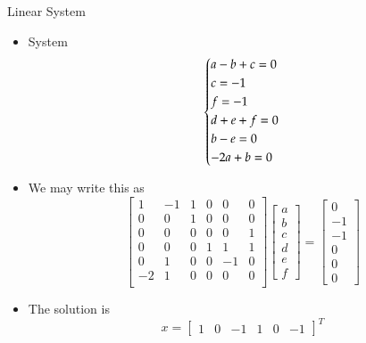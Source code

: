 \documentclass[10pt]{beamer}
\begin{document}
\begin{frame}{Linear System}

\begin{itemize}
    \item System 
    $$
    \begin{dcases}
        a - b + c=0\\
        c = -1\\
        f = -1\\
        d + e + f = 0\\
        b -e= 0\\
        -2a+b = 0
    \end{dcases}
    $$
    \item We may write this as
    $$
    \begin{bmatrix}
        1 & -1 & 1 & 0 & 0 &0\\
        0 & 0 & 1 & 0 & 0 & 0\\
        0 & 0 & 0 & 0 & 0 & 1\\
        0 & 0 & 0 & 1 & 1 & 1\\
        0 & 1 & 0 & 0 & -1 & 0\\
        -2 & 1 & 0 & 0 & 0 & 0\\
    \end{bmatrix}\begin{bmatrix}
        a\\b\\c\\d\\e\\f
    \end{bmatrix}=\begin{bmatrix}
        0\\-1\\-1\\0\\0\\0
    \end{bmatrix}
    $$
    \item The solution is
    $$
    x=\begin{bmatrix}
        1 & 0 & -1 & 1 & 0 & -1
    \end{bmatrix}^T$$
\end{itemize}

\end{frame}
\end{document}
